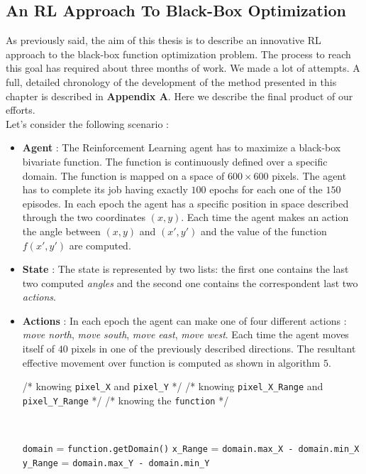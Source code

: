 \subsection{An RL Approach To Black-Box Optimization} As previously said, the aim of this thesis is to describe an innovative RL approach to the black-box function optimization problem. The process to reach this goal has required about three months of work. We made a lot of attempts. A full, detailed chronology of the development of the method presented in this chapter is described in \textbf{Appendix A}. Here we describe the final product of our efforts. \\

Let's consider the following scenario :

\begin{itemize}
	
	\item \textbf{Agent} : The Reinforcement Learning agent has to maximize a black-box bivariate function. The function is continuously defined over a specific domain. The function is mapped on a space of $600 \times 600$ pixels. The agent has to complete its job having exactly $100$ epochs for each one of the $150$ episodes. In each epoch the agent has a specific position in space described through the two coordinates $(x, y)$. Each time the agent makes an action the angle between $(x, y)$ and $(x', y')$ and the value of the function $f(x', y')$ are computed.
	
	\item \textbf{State} : The state is represented by two lists: the first one contains the last two computed \textit{angles} and the second one contains the correspondent last two \textit{actions}.
	
	\item \textbf{Actions} : In each epoch the agent can make one of four different actions : \textit{move north}, \textit{move  south}, \textit{move east}, \textit{move west}. Each time the agent moves itself of $40$ pixels in one of the previously described directions. The resultant effective movement over function is computed as shown in algorithm $5$.
	
	\begin{algorithm} [h!]
		/* knowing {\tt pixel\_X} and {\tt pixel\_Y} */\;
		/* knowing {\tt pixel\_X\_Range} and {\tt pixel\_Y\_Range} */ \;
		/* knowing the {\tt function} */\;
		
		\
		
		{\tt domain} = {\tt function.getDomain()} \;
		{\tt x\_Range} = {\tt domain.max\_X - domain.min\_X} \;
		{\tt y\_Range} = {\tt domain.max\_Y - domain.min\_Y} \;
		

\end{algorithm}
\end{itemize}
